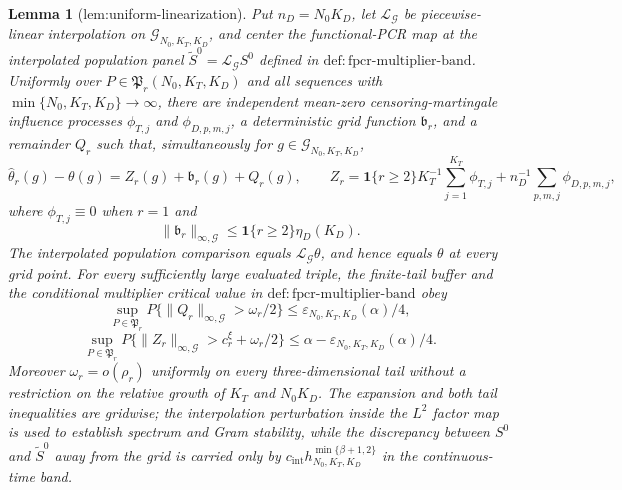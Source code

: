 \documentclass{article}
\newtheorem{lemma}{Lemma}
\begin{document}
\begin{lemma}[lem:uniform-linearization]\label{lem:uniform-linearization}
Put \(n_D=N_0K_D\), let \(\mathcal L_{\mathcal G}\) be piecewise-linear interpolation on \(\mathcal G_{N_0,K_T,K_D}\), and center the functional-PCR map at the interpolated population panel \(\widetilde S^0=\mathcal L_{\mathcal G}S^0\) defined in \(\mathrm{def:fpcr\mbox{-}multiplier\mbox{-}band}\). Uniformly over \(P\in\mathfrak P_r(N_0,K_T,K_D)\) and all sequences with \(\min\{N_0,K_T,K_D\}\to\infty\), there are independent mean-zero censoring-martingale influence processes \(\phi_{T,j}\) and \(\phi_{D,p,m,j}\), a deterministic grid function \(\mathfrak b_r\), and a remainder \(Q_r\) such that, simultaneously for \(g\in\mathcal G_{N_0,K_T,K_D}\),
\[
 \widehat\theta_r(g)-\theta(g)=Z_r(g)+\mathfrak b_r(g)+Q_r(g),
 \qquad
 Z_r=\mathbf 1\{r\ge2\}K_T^{-1}\sum_{j=1}^{K_T}\phi_{T,j}
     +n_D^{-1}\sum_{p,m,j}\phi_{D,p,m,j},
\]
where \(\phi_{T,j}\equiv0\) when \(r=1\) and
\[
 \|\mathfrak b_r\|_{\infty,\mathcal G}
 \le \mathbf 1\{r\ge2\}\eta_D(K_D).
\]
The interpolated population comparison equals \(\mathcal L_{\mathcal G}\theta\), and hence equals \(\theta\) at every grid point. For every sufficiently large evaluated triple, the finite-tail buffer and the conditional multiplier critical value in \(\mathrm{def:fpcr\mbox{-}multiplier\mbox{-}band}\) obey
\[
 \sup_{P\in\mathfrak P_r}P\{\|Q_r\|_{\infty,\mathcal G}>\omega_r/2\}
 \le\varepsilon_{N_0,K_T,K_D}(\alpha)/4,
\]
\[
 \sup_{P\in\mathfrak P_r}P\{\|Z_r\|_{\infty,\mathcal G}>c_r^\xi+\omega_r/2\}
 \le\alpha-\varepsilon_{N_0,K_T,K_D}(\alpha)/4.
\]
Moreover \(\omega_r=o(\rho_r)\) uniformly on every three-dimensional tail without a restriction on the relative growth of \(K_T\) and \(N_0K_D\). The expansion and both tail inequalities are gridwise; the interpolation perturbation inside the \(L^2\) factor map is used to establish spectrum and Gram stability, while the discrepancy between \(S^0\) and \(\widetilde S^0\) away from the grid is carried only by \(c_{\mathrm{int}}h_{N_0,K_T,K_D}^{\min\{\beta+1,2\}}\) in the continuous-time band.
\end{lemma}
\end{document}
